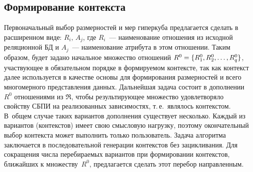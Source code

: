 \begin{multicols}{2}
\vspace*{-6pt}
  
\subsection{Формирование контекста} %

\vspace*{-2pt}
  
  Первоначальный выбор размерностей и мер гиперкуба предлагается сделать 
в расширенном виде: $R_i,\,A_j$, где $R_i$~--- наименование отношения из 
исходной реляционной БД и $A_j$~--- наименование атрибута в этом отношении. 
Таким образом, будет задано начальное множество отношений $R^0\hm= \{ 
R_1^0, R_2^0, \ldots , R_q^0\}$, участвующее в обязательном порядке в 
формируемом контексте, так как контекст далее используется в качестве 
основы для формирования размерностей и всего многомерного представления 
данных. Дальнейшая задача состоит в дополнении $R^0$ отношениями из 
$\Re$, чтобы результирующее множество удовлетворяло свойству СБПИ на 
реализованных зависимостях, т.\,е.\ являлось контекстом. В~общем случае 
таких вариантов дополнения существует несколько. Каждый из вариантов 
(контекстов) имеет свою смысловую нагрузку, поэтому окончательный выбор 
контекста может выполнить только пользователь. Задача алгоритма 
заключается в последовательной генерации контекстов без зацикливания. Для 
сокращения числа перебираемых вариантов при формировании контекстов, 
ближайших к множеству~$R^0$, предлагается сделать этот перебор 
направленным.
  

\end{multicols}
